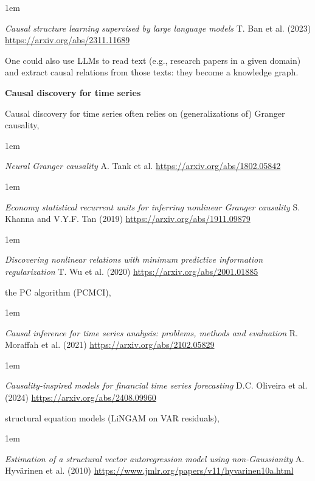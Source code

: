 \documentclass[a5paper]{article}
\newenvironment{reference}{%
  \medskip\goodbreak
  \parskip 0pt
  \raggedright
  \leftskip 1em
  \obeylines
}{\par\medskip\goodbreak}
\def\subsection#1{{\par\bigskip\goodbreak\large\bfseries #1\par}}
\begin{document}
\begin{reference}
  \emph{Causal structure learning supervised by large language models}
  T. Ban et al. (2023)
  \url{https://arxiv.org/abs/2311.11689}
\end{reference}

One could also use LLMs to read text (e.g., research papers in a given domain) and
extract causal relations from those texts:
they become a knowledge graph.
  
\subsection{Causal discovery for time series}

Causal discovery for time series often relies on (generalizations of) Granger causality,

\begin{reference}
  \emph{Neural Granger causality}
  A. Tank et al.
  \url{https://arxiv.org/abs/1802.05842}
\end{reference}

\begin{reference}
  \emph{Economy statistical recurrent units for inferring nonlinear Granger causality}
  S. Khanna and V.Y.F. Tan (2019)
  \url{https://arxiv.org/abs/1911.09879}
\end{reference}

\begin{reference}
  \emph{Discovering nonlinear relations with minimum predictive information regularization}
  T. Wu et al.  (2020)
  \url{https://arxiv.org/abs/2001.01885}
\end{reference}

the PC algorithm (PCMCI), 

\begin{reference}
  \emph{Causal inference for time series analysis: problems, methods and evaluation}
  R. Moraffah et al. (2021)
  \url{https://arxiv.org/abs/2102.05829}
\end{reference}

\begin{reference}
  \emph{Causality-inspired models for financial time series forecasting}
  D.C. Oliveira et al. (2024)
  \url{https://arxiv.org/abs/2408.09960}
\end{reference}

structural equation models (LiNGAM on VAR residuals),

\begin{reference}
  \emph{Estimation of a structural vector autoregression model using non-Gaussianity}
  A. Hyvärinen et al. (2010)
  \url{https://www.jmlr.org/papers/v11/hyvarinen10a.html}
\end{reference}
\end{document}
